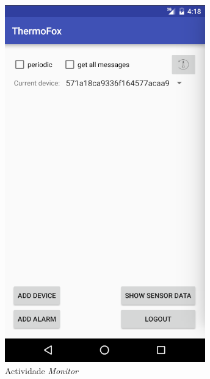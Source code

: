 \documentclass[a4paper]{article}
\begin{document}
\begin{figure}[H]
  \includegraphics[width=\linewidth]{login.png}
  \caption{Actividade \textit{Monitor}}\label{fig:logs}
\endminipage\hfill
{}%

\end{figure}
\end{document}
